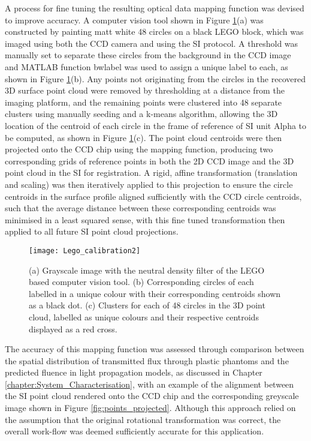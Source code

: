 \documentclass[twoside]{bhamthesis}
\theoremstyle{definition}
\begin{document}
A process for fine tuning the resulting optical data mapping function was devised to improve accuracy. A computer vision tool shown in Figure \ref{fig:Lego_calibration2}(a) was constructed by painting matt white 48 circles on a black LEGO block, which was imaged using both the CCD camera and using the SI protocol. A threshold was manually set to separate these circles from the background in the CCD image and MATLAB function bwlabel was used to assign a unique label to each, as shown in Figure \ref{fig:Lego_calibration2}(b). Any points not originating from the circles in the recovered 3D surface point cloud were removed by thresholding at a distance from the imaging platform, and the remaining points were clustered into 48 separate clusters using manually seeding and a k-means algorithm, allowing the 3D location of the centroid of each circle in the frame of reference of SI unit Alpha to be computed, as shown in Figure \ref{fig:Lego_calibration2}(c). The point cloud centroids were then projected onto the CCD chip using the mapping function,  producing two corresponding grids of reference points in both the 2D CCD image and the 3D point cloud in the SI for registration. A rigid, affine transformation (translation and scaling) was then iteratively applied to this projection to ensure the circle centroids in the surface profile aligned sufficiently with the CCD circle centroids, such that the average distance between these corresponding centroids was minimised in a least squared sense, with this fine tuned transformation then applied to all future SI point cloud projections.

\begin{figure}[!ht]
\texttt{[image: Lego\_calibration2]}
\centering
\caption{(a) Grayscale image with the neutral density filter of the LEGO based computer vision tool. (b) Corresponding circles of each labelled in a unique colour with their corresponding centroids shown as a black dot. (c) Clusters for each of 48 circles in the 3D point cloud, labelled as unique colours and their respective centroids displayed as a red cross.}
\centering
\label{fig:Lego_calibration2}
\end{figure}

The accuracy of this mapping function was assessed through comparison between the spatial distribution of transmitted flux through plastic phantoms and the predicted fluence in light propagation models, as discussed in Chapter \ref{chapter:System_Characterisation}, with an example of the alignment between the SI point cloud rendered onto the CCD chip and the corresponding greyscale image shown in Figure \ref{fig:points_projected}. Although this approach relied on the assumption that the original rotational transformation was correct, the overall work-flow was deemed sufficiently accurate for this application.
\end{document}
